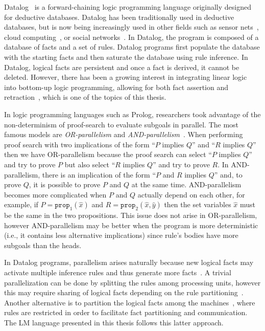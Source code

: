 Datalog~\cite{Ramakrishnan93asurvey,Ullman:1990:PDK:533142} is a
forward-chaining logic programming language originally designed for deductive
databases. Datalog has been traditionally used in deductive databases, but is
now being increasingly used in other fields such as sensor
nets~\cite{Chu:2007:DID:1322263.1322281}, cloud computing~\cite{alvaro:boom}, or
social networks~\cite{Seo:2013:DSD:2556549.2556572}.  In Datalog, the program is
composed of a database of facts and a set of rules.  Datalog programs first
populate the database with the starting facts and then saturate the database
using rule inference. In Datalog, logical facts are persistent and once a fact
is derived, it cannot be deleted. However, there has been a growing interest in
integrating linear logic~\cite{girard-87} into bottom-up logic programming,
allowing for both fact assertion and
retraction~\cite{Chang03ajudgmental,Lopez:2005:MCL:1069774.1069778,simmons-lla,cruz-iclp14},
which is one of the topics of this thesis.

In logic programming languages such as Prolog, researchers took advantage of the
non-determinism of proof-search to evaluate subgoals in parallel. The most
famous models are \emph{OR-parallelism} and
\emph{AND-parallelism}~\cite{Gupta:2001:PEP:504083.504085}. When performing
proof search with two implications of the form ``$P$ implies $Q$'' and ``$R$
implies $Q$'' then we have OR-parallelism because the proof search can select
``$P$ implies $Q$'' and try to prove $P$ but also select ``$R$ implies $Q$'' and
try to prove $R$. In AND-parallelism, there is an implication of the form ``$P$
and $R$ implies $Q$'' and, to prove $Q$, it is possible to prove $P$ and $Q$ at
the same time. AND-parallelism becomes more complicated when $P$ and $Q$
actually depend on each other, for example, if $P = \mathtt{prop}_1(\hat{x})$
and $R = \mathtt{prop}_2(\hat{x}, \hat{y})$ then the set variables $\hat{x}$
must be the same in the two propositions. This issue does not arise in
OR-parallelism, however AND-parallelism may be better when the program is more
deterministic (i.e., it contains less alternative implications) since rule's
bodies have more subgoals than the heads.

In Datalog programs, parallelism arises naturally because new logical facts may
activate multiple inference rules and thus generate more
facts~\cite{Ganguly:1990:FPP:93597.98724,Seib:1991:PDP:113413.113435,Wolfson:1988:DPL:971701.50242}.
A trivial parallelization can be done by splitting the rules among processing
units, however this may require sharing of logical facts depending on the rule
partitioning~\cite{Wolfson:1988:DPL:971701.50242}. Another alternative is to
partition the logical facts among the
machines~\cite{183073,Loo-condie-garofalakis-p2}, where rules are restricted in
order to facilitate fact partitioning and communication. The LM language
presented in this thesis follows this latter approach.


